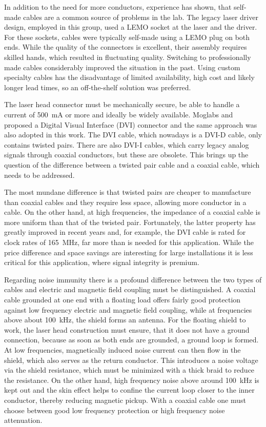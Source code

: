 In addition to the need for more conductors, experience has shown, that self-made cables are a common source of problems in the lab. The legacy laser driver design, employed in this group, used a LEMO  socket at the laser and the driver. For these sockets, cables were typically self-made using a LEMO  plug on both ends. While the quality of the connectors is excellent, their assembly requires skilled hands, which resulted in fluctuating quality. Switching to professionally made cables considerably improved the situation in the past. Using custom specialty cables has the disadvantage of limited availability, high cost and likely longer lead times, so an off-the-shelf solution was preferred.

The laser head connector must be mechanically secure, be able to handle a current of \qty{500}{\mA} or more and ideally be widely available. Moglabs and \citeauthor{laser_driver_digital_update} proposed a Digital Visual Interface (DVI) connector \cite{laser_driver_digital_update} and the same approach was also adopted in this work. The DVI cable, which nowadays is a DVI-D cable, only contains twisted pairs. There are also DVI-I cables, which carry legacy analog signals through coaxial conductors, but these are obsolete. This brings up the question of the difference between a twisted pair cable and a coaxial cable, which needs to be addressed.

The most mundane difference is that twisted pairs are cheaper to manufacture than coaxial cables and they require less space, allowing more conductor in a cable. On the other hand, at high frequencies, the impedance of a coaxial cable is more uniform than that of the twisted pair. Fortunately, the latter property has greatly improved in recent years and, for example, the DVI cable is rated for clock rates of \qty{165}{\MHz}, far more than is needed for this application. While the price difference and space savings are interesting for large installations it is less critical for this application, where signal integrity is premium.

Regarding noise immunity there is a profound difference between the two types of cables and electric and magnetic field coupling must be distinguished. A coaxial cable grounded at one end with a floating load offers fairly good protection against low frequency electric and magnetic field coupling, while at frequencies above about \qty{100}{\kHz}, the shield forms an antenna. For the floating shield to work, the laser head construction must ensure, that it does not have a ground connection, because as soon as both ends are grounded, a ground loop is formed. At low frequencies, magnetically induced noise current can then flow in the shield, which also serves as the return conductor. This introduces a noise voltage via the shield resistance, which must be minimized with a thick braid to reduce the resistance. On the other hand, high frequency noise above around \qty{100}{\kHz} is kept out and the skin effect helps to confine the current loop closer to the inner conductor, thereby reducing magnetic pickup. With a coaxial cable one must choose between good low frequency protection or high frequency noise attenuation.

